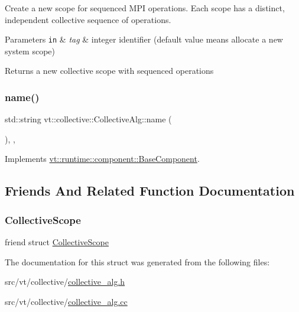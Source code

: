 Create a new scope for sequenced M\+PI operations. Each scope has a distinct, independent collective sequence of operations. 


\begin{DoxyParams}[1]{Parameters}
\mbox{\tt in}  & {\em tag} & integer identifier (default value means allocate a new system scope)\\
\hline
\end{DoxyParams}
\begin{DoxyReturn}{Returns}
a new collective scope with sequenced operations 
\end{DoxyReturn}
\mbox{\label{structvt_1_1collective_1_1_collective_alg_a81788afa34bc094c9f71fef8681aefb3}} 
\subsubsection{\texorpdfstring{name()}{name()}}
{\footnotesize\ttfamily std\+::string vt\+::collective\+::\+Collective\+Alg\+::name (\begin{DoxyParamCaption}{ }\end{DoxyParamCaption})\hspace{0.3cm}{\ttfamily [inline]}, {\ttfamily [override]}, {\ttfamily [virtual]}}



Implements \hyperlink{structvt_1_1runtime_1_1component_1_1_base_component_a7701485f3539f78d42e6bad47fc7eb78}{vt\+::runtime\+::component\+::\+Base\+Component}.



\subsection{Friends And Related Function Documentation}
\mbox{\label{structvt_1_1collective_1_1_collective_alg_a915db0886f5b77be011e5a55413319f5}} 
\subsubsection{\texorpdfstring{Collective\+Scope}{CollectiveScope}}
{\footnotesize\ttfamily friend struct \hyperlink{structvt_1_1collective_1_1_collective_scope}{Collective\+Scope}\hspace{0.3cm}{\ttfamily [friend]}}



The documentation for this struct was generated from the following files\+:\begin{DoxyCompactItemize}
\item 
src/vt/collective/\hyperlink{collective__alg_8h}{collective\+\_\+alg.\+h}\item 
src/vt/collective/\hyperlink{collective__alg_8cc}{collective\+\_\+alg.\+cc}\end{DoxyCompactItemize}
